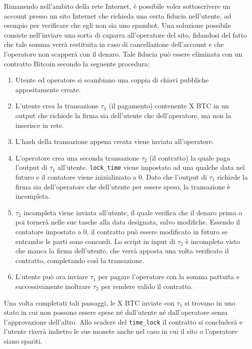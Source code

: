 Rimanendo nell'ambito della rete Internet, è possibile voler sottoscrivere un account presso un sito Internet che richieda una certa fiducia nell'utente, ad esempio per verificare che egli non sia uno spambot. Una soluzione possibile consiste nell'inviare una sorta di caparra all'operatore del sito, fidandosi del fatto che tale somma verrà restituita in caso di cancellazione dell'account e che l'operatore non scapperà con il denaro. Tale fiducia può essere eliminata con un contratto Bitcoin secondo la seguente procedura:
\begin{enumerate}
    \item Utente ed operatore si scambiano una coppia di chiavi pubbliche appositamente create.
    \item L'utente crea la transazione $\tau_1$ (il pagamento) contenente X BTC in un output che richiede la firma sia dell'utente che dell'operatore, ma non la inserisce in rete.
    \item L'hash della transazione appena creata viene inviata all'operatore.
    \item L'operatore crea una seconda transazione $\tau_2$ (il contratto) la quale paga l'output di $\tau_1$ all'utente. \verb|lock_time| viene impostato ad una qualche data nel futuro e il contatore viene inizializzato a 0. Dato che l'output di $\tau_1$ richiede la firma sia dell'operatore che dell'utente per essere speso, la transazione è incompleta.
    \item $\tau_2$ incompleta viene inviata all'utente, il quale verifica che il denaro prima o poi tornerà nelle sue tasche alla data designata, salvo modifiche. Essendo il contatore impostato a 0, il contratto può essere modificato in futuro se entrambe le parti sono concordi. Lo script in input di $\tau_2$ è incompleto visto che manca la firma dell'utente, che verrà apposta una volta verificato il contratto, completando così la transazione.
    \item L'utente può ora inviare $\tau_1$ per pagare l'operatore con la somma pattuita e successivamente inoltrare $\tau_2$ per rendere valido il contratto.
\end{enumerate}

Una volta completati tali passaggi, le X BTC inviate con $\tau_1$ si trovano in uno stato in cui non possono essere spese né dall'utente né dall'operatore senza l'approvazione dell'altro. Allo scadere del \verb|time_lock| il contratto si concluderà e l'utente riavrà indietro le sue monete anche nel caso in cui il sito o l'operatore siano spariti.\\

